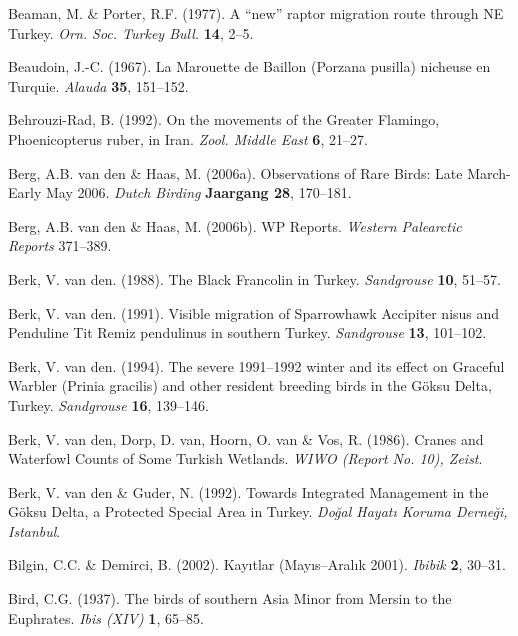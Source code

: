 \documentclass[
  a4paper,
  DIV=11,
  numbers=noendperiod]{scrreprt}
\newlength{\cslhangindent}
\newenvironment{CSLReferences}[2] %
 {\begin{list}{}{%
  \setlength{\itemindent}{0pt}
  \setlength{\leftmargin}{0pt}
  \setlength{\parsep}{0pt}
  \ifodd #1
   \setlength{\leftmargin}{\cslhangindent}
   \setlength{\itemindent}{-1\cslhangindent}
  \fi
  \setlength{\itemsep}{#2\baselineskip}}}
 {\end{list}}
\begin{document}
\begin{CSLReferences}{1}{1}
Beaman, M. \& Porter, R.F. (1977). {A {``new''} raptor migration route
through NE Turkey}. \emph{Orn. Soc. Turkey Bull.} \textbf{14}, 2--5.

Beaudoin, J.-C. (1967). {La Marouette de Baillon ({Porzana pusilla})
nicheuse en Turquie}. \emph{Alauda} \textbf{35}, 151--152.

Behrouzi-Rad, B. (1992). {On the movements of the Greater Flamingo,
{Phoenicopterus ruber}, in Iran}. \emph{Zool. Middle East} \textbf{6},
21--27.

Berg, A.B. van den \& Haas, M. (2006a). {Observations of Rare Birds:
Late March-Early May 2006}. \emph{Dutch Birding} \textbf{Jaargang 28},
170--181.

Berg, A.B. van den \& Haas, M. (2006b). {WP Reports}. \emph{Western
Palearctic Reports} 371--389.

Berk, V. van den. (1988). {The Black Francolin in Turkey}.
\emph{Sandgrouse} \textbf{10}, 51--57.

Berk, V. van den. (1991). {Visible migration of Sparrowhawk {Accipiter
nisus} and Penduline Tit {Remiz pendulinus} in southern Turkey}.
\emph{Sandgrouse} \textbf{13}, 101--102.

Berk, V. van den. (1994). {The severe 1991--1992 winter and its effect
on Graceful Warbler ({Prinia gracilis}) and other resident breeding
birds in the Göksu Delta, Turkey}. \emph{Sandgrouse} \textbf{16},
139--146.

Berk, V. van den, Dorp, D. van, Hoorn, O. van \& Vos, R. (1986). {Cranes
and Waterfowl Counts of Some Turkish Wetlands}. \emph{WIWO (Report No.
10), Zeist}.

Berk, V. van den \& Guder, N. (1992). {Towards Integrated Management in
the Göksu Delta, a Protected Special Area in Turkey}. \emph{Doğal Hayatı
Koruma Derneği, Istanbul}.

Bilgin, C.C. \& Demirci, B. (2002). {Kayıtlar (Mayıs--Aralık 2001)}.
\emph{Ibibik} \textbf{2}, 30--31.

Bird, C.G. (1937). {The birds of southern Asia Minor from Mersin to the
Euphrates}. \emph{Ibis (XIV)} \textbf{1}, 65--85.


\end{CSLReferences}
\end{document}
